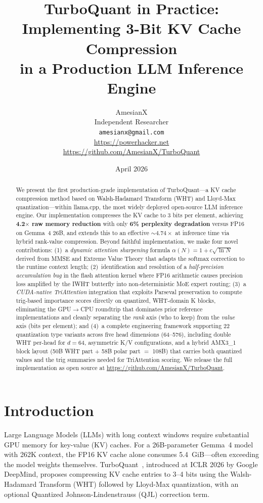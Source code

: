 \documentclass[10pt,twocolumn]{article}
\title{TurboQuant in Practice: Implementing 3-Bit KV Cache Compression\\in a Production LLM Inference Engine}
\author{
AmesianX\\
Independent Researcher\\
\texttt{amesianx@gmail.com}\\
\url{https://powerhacker.net}\\
\url{https://github.com/AmesianX/TurboQuant}
}
\date{April 2026}
\begin{document}
\maketitle

\begin{abstract}
We present the first production-grade implementation of TurboQuant---a KV cache compression method based on Walsh-Hadamard Transform (WHT) and Lloyd-Max quantization---within llama.cpp, the most widely deployed open-source LLM inference engine. Our implementation compresses the KV cache to 3 bits per element, achieving \textbf{4.2$\times$ raw memory reduction} with only \textbf{6\% perplexity degradation} versus FP16 on Gemma~4 26B, and extends this to an effective \textbf{${\sim}4.74\times$} at inference time via hybrid rank-value compression. Beyond faithful implementation, we make four novel contributions: (1)~a \emph{dynamic attention sharpening} formula $\alpha(N) = 1 + c\sqrt{\ln N}$ derived from MMSE and Extreme Value Theory that adapts the softmax correction to the runtime context length; (2)~identification and resolution of a \emph{half-precision accumulation bug} in the flash attention kernel where FP16 arithmetic causes precision loss amplified by the IWHT butterfly into non-deterministic MoE expert routing; (3)~a \emph{CUDA-native TriAttention} integration that exploits Parseval preservation to compute trig-based importance scores directly on quantized, WHT-domain K blocks, eliminating the GPU$\to$CPU roundtrip that dominates prior reference implementations and cleanly separating the \emph{rank} axis (who to keep) from the \emph{value} axis (bits per element); and (4)~a complete engineering framework supporting 22 quantization type variants across five head dimensions (64--576), including double WHT per-head for $d{=}64$, asymmetric K/V configurations, and a hybrid AMX3\_1 block layout (50B WHT part + 58B polar part $=$ 108B) that carries both quantized values and the trig summaries needed for TriAttention scoring. We release the full implementation as open source at \url{https://github.com/AmesianX/TurboQuant}.
\end{abstract}

\section{Introduction}
\label{sec:intro}

Large Language Models (LLMs) with long context windows require substantial GPU memory for key-value (KV) caches. For a 26B-parameter Gemma~4 model with 262K context, the FP16 KV cache alone consumes 5.4~GiB---often exceeding the model weights themselves. TurboQuant~\cite{turboquant2026}, introduced at ICLR 2026 by Google DeepMind, proposes compressing KV cache entries to 3--4 bits using the Walsh-Hadamard Transform (WHT) followed by Lloyd-Max quantization, with an optional Quantized Johnson-Lindenstrauss (QJL) correction term.
\end{document}
